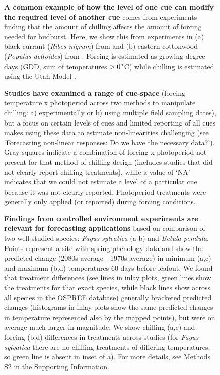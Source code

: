 \documentclass[11pt,letter]{article}
\begin{document}
\begin{figure}
\centering
\caption{{\bf A common example of how the level of one cue can modify the required level of another cue} comes from experiments finding that the amount of chilling affects the amount of forcing needed for budburst. Here, we show this from experiments in (a)  black currant (\emph{Ribes nigrum}) from \citet{Sonsteby:2014aa} and (b) eastern cottonwood (\emph{Populus deltoides}) from \citet{Thielges:1976aa}. Forcing is estimated as growing degree days (GDD, sum of temperatures $>0\degree$C) while chilling is estimated using the Utah Model \citep[see][]{richardson1974}.} %
  \label{fig:gddbyutah} 
\end{figure}


\begin{figure}[t!]
\centering
\caption{{\bf Studies have examined a range of cue-space} (forcing temperature x photoperiod across two methods to manipulate chilling: a) experimentally or b) using multiple field sampling dates), but a focus on certain levels of cues and limited reporting of all cues makes using these data to estimate non-linearities challenging (see `Forecasting non-linear responses: Do we have the necessary data?'). Gray squares indicate a combination of forcing x photoperiod not present for that method of chilling design (includes studies that did not clearly report chilling treatments), while a value of `NA' indicates that we could not estimate a level of a particular cue because it was not clearly reported. Photoperiod treatments were generally only applied (or reported) during forcing conditions.}
  \label{fig:heatmaps} 
\end{figure}

\begin{figure}[t!]
\centering
\caption{{\bf Findings from controlled environment experiments are relevant for forecasting applications} based on comparison of two well-studied species: \emph{Fagus sylvatica} (a-b) and \emph{Betula pendula}. Points represent a site with spring phenology data  \citep[from the PEP725 database,][]{Templ2018} and show the predicted change (2080s average - 1970s average) in minimum (a,c) and maximum (b,d) temperatures 60 days before leafout. We found that treatment differences (see lines in inlay plots, green lines show the treatments for that exact species, while black lines show across all species in the OSPREE database) generally bracketed predicted changes (histograms in inlay plots show the same predicted changes in temperature represented also by the mapped points), but were on average much larger in magnitude. We show chilling (a,c) and forcing (b,d) differences in treatments across studies (for \emph{Fagus sylvatica} there are no chilling treatments of differing temperatures, so green line is absent in inset of a). For more details, see Methods S2 in the Supporting Information.}
\label{fig:pep} %
\end{figure}
\end{document}
